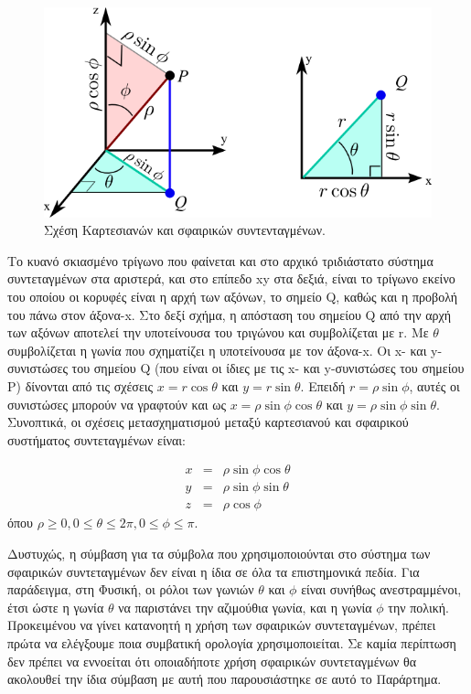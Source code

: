 \begin{figure}[h]
    \centering
    \includegraphics[scale=0.5]{Figures/appendixA_spherical_coordinates_analytical.png}
    \caption{Σχέση Καρτεσιανών και σφαιρικών συντενταγμένων.}
    \label{fig:apxA_spherical_coordinates_derivation}
\end{figure}

Το κυανό σκιασμένο τρίγωνο που φαίνεται και στο αρχικό τριδιάστατο σύστημα συντεταγμένων στα αριστερά, και στο επίπεδο xy στα δεξιά, είναι το τρίγωνο εκείνο του οποίου οι κορυφές είναι η αρχή των αξόνων, το σημείο Q, καθώς και η προβολή του πάνω στον άξονα-x. Στο δεξί σχήμα, η απόσταση του σημείου Q από την αρχή των αξόνων αποτελεί την υποτείνουσα του τριγώνου και συμβολίζεται με r. Με $\theta$ συμβολίζεται η γωνία που σχηματίζει η υποτείνουσα με τον άξονα-x. Οι x- και y-συνιστώσες του σημείου Q (που είναι οι ίδιες με τις x- και y-συνιστώσες του σημείου P) δίνονται από τις σχέσεις $x=r \cos \theta$ και $y=r \sin \theta$. Επειδή $r = \rho \sin \phi$, αυτές οι συνιστώσες μπορούν να γραφτούν και ως $x = \rho \sin \phi \cos \theta$ και $y = \rho \sin \phi \sin \theta$. Συνοπτικά, οι σχέσεις μετασχηματισμού μεταξύ καρτεσιανού και σφαιρικού συστήματος συντεταγμένων είναι:

\begin{eqnarray}
    x &=& \rho \sin \phi \cos \theta \\
    y &=& \rho \sin \phi \sin \theta \\
    z &=& \rho \cos \phi
\end{eqnarray}
όπου $\rho \geq 0, 0 \leq \theta \leq 2\pi, 0 \leq \phi \leq \pi$.

Δυστυχώς, η σύμβαση για τα σύμβολα που χρησιμοποιούνται στο σύστημα των σφαιρικών συντεταγμένων δεν είναι η ίδια σε όλα τα επιστημονικά πεδία. Για παράδειγμα, στη Φυσική, οι ρόλοι των γωνιών $\theta$ και $\phi$ είναι συνήθως ανεστραμμένοι, έτσι ώστε η γωνία $\theta$ να παριστάνει την αζιμούθια γωνία, και η γωνία $\phi$ την πολική. Προκειμένου να γίνει κατανοητή η χρήση των σφαιρικών συντεταγμένων, πρέπει πρώτα να ελέγξουμε ποια συμβατική ορολογία χρησιμοποιείται. Σε καμία περίπτωση δεν πρέπει να εννοείται ότι οποιαδήποτε χρήση σφαιρικών συντεταγμένων θα ακολουθεί την ίδια σύμβαση με αυτή που παρουσιάστηκε σε αυτό το Παράρτημα.
